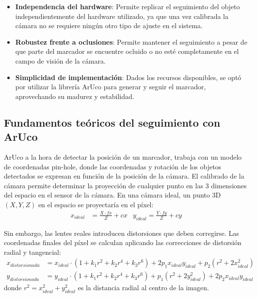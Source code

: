 \begin{itemize}
    \item \textbf{Independencia del hardware}: Permite replicar el seguimiento del objeto independientemente del hardware utilizado, ya que una vez calibrada la cámara no se requiere ningún otro tipo de ajuste en el sistema.
    \item \textbf{Robustez frente a oclusiones}: Permite mantener el seguimiento a pesar de que parte del marcador se encuentre ocluido o no esté completamente en el campo de visión de la cámara.
    \item \textbf{Simplicidad de implementación}: Dados los recursos disponibles, se optó por utilizar la librería ArUco para generar y seguir el marcador, aprovechando su madurez y estabilidad.
\end{itemize}

\subsection{Fundamentos teóricos del seguimiento con ArUco}

ArUco a la hora de detectar la posición de un marcador, trabaja con un modelo de coordenadas pin-hole, donde las coordenadas y rotación de los objetos detectados se expresan en función de la posición de la cámara.
El calibrado de la cámara permite determinar la proyección de cualquier punto en las 3 dimensiones del espacio en el sensor de la cámara. En una cámara ideal, un punto 3D $(X, Y, Z)$ en el espacio se proyectaría en el píxel:
\begin{align*}
	x_{ideal} & = \frac{X \cdot fx}{Z} + cx & y_{ideal} = \frac{Y \cdot fy}{Z} + cy
\end{align*}

Sin embargo, las lentes reales introducen distorsiones que deben corregirse. Las coordenadas finales del píxel se calculan aplicando las correcciones de distorsión radial y tangencial:
\begin{align*}
	x_{distorsionada} &= x_{ideal} \cdot (1 + k_1 r^2 + k_2 r^4 + k_3 r^6) + 2p_1 x_{ideal} y_{ideal} + p_2(r^2 + 2x_{ideal}^2) \\
	y_{distorsionada} &= y_{ideal} \cdot (1 + k_1 r^2 + k_2 r^4 + k_3 r^6) + p_1(r^2 + 2y_{ideal}^2) + 2p_2 x_{ideal} y_{ideal}
\end{align*}
donde $r^2 = x_{ideal}^2 + y_{ideal}^2$ es la distancia radial al centro de la imagen.

